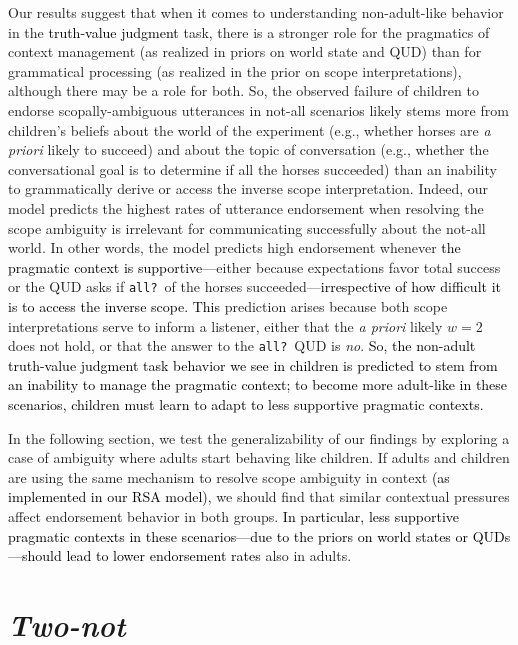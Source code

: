 \documentclass[cm]{glossa}
\newcommand{\lp}[1]{\textcolor{black}{#1}} %
\begin{document}
Our results suggest that when it comes to understanding non-adult-like behavior in the 
\lp{truth-value judgment}
task, there is a stronger role for the pragmatics of context management (as realized in priors on world state and QUD) than for grammatical processing (as realized in the prior on scope interpretations), although there may be a role for both. So, the observed failure of children to endorse scopally-ambiguous utterances in not-all scenarios likely stems more from children's beliefs about the world of the experiment (e.g., whether horses are \emph{a priori} likely to succeed) and about the topic of conversation (e.g., whether the conversational goal is to determine if all the horses succeeded) than an inability to grammatically derive or access the inverse scope interpretation. Indeed, our model predicts the highest rates of utterance endorsement when 
resolving the scope ambiguity is irrelevant for communicating successfully about the not-all world. In other words, the model predicts high endorsement whenever
\lp{the pragmatic context is supportive---}either because expectations favor total success or 
the QUD asks if \texttt{all?}~of the horses succeeded---\lp{irrespective of how difficult it is to access the inverse scope.}
%
\lp{This} prediction arises because
both scope interpretations serve to inform a listener, either that the \emph{a priori} likely $w=2$ does not hold, or that the answer to the \texttt{all?}~QUD is \emph{no}. 
\lp{So, the non-adult truth-value judgment task behavior we see in children is predicted to stem from an inability to manage the pragmatic context; to become more adult-like in these scenarios, children must learn to adapt to less supportive pragmatic contexts.}

In the following section, we test the generalizability of our findings by exploring a case of ambiguity where adults start behaving like children.
If adults and children are using the same mechanism to resolve scope ambiguity in context \lp{(as implemented in our RSA model)}, we should find that similar contextual pressures affect endorsement behavior in both groups.
\lp{In particular, less supportive pragmatic contexts in these scenarios---due to the priors on world states or QUDs---should lead to lower endorsement rates} also in adults.



\section{\emph{Two-not}} \label{two-not-model}
\end{document}
